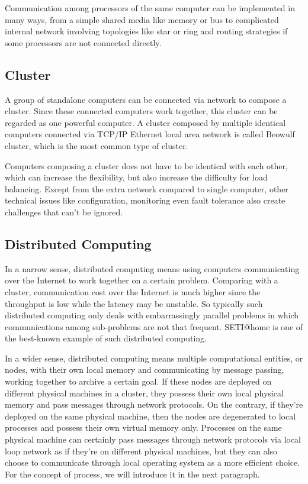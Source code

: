\documentclass[12pt,a4]{report}
\begin{document}
Communication among processors of the same computer can be implemented in many ways, from a simple shared media like memory or bus to complicated internal network involving topologies like star or ring and routing strategies if some processors are not connected directly.

\subsection{Cluster}

A group of standalone computers can be connected via network to compose a cluster. Since these connected computers work together, this cluster can be regarded as one powerful computer. A cluster composed by multiple identical computers connected via TCP/IP Ethernet local area network is called Beowulf cluster, which is the most common type of cluster.

Computers composing a cluster does not have to be identical with each other, which can increase the flexibility, but also increase the difficulty for load balancing. Except from the extra network compared to single computer, other technical issues like configuration, monitoring even fault tolerance also create challenges that can't be ignored.

\subsection{Distributed Computing}

In a narrow sense, distributed computing means using computers communicating over the Internet to work together on a certain problem. Comparing with a cluster, communication cost over the Internet is much higher since the throughput is low while the latency may be unstable. So typically such distributed computing only deals with embarrassingly parallel problems in which communications among sub-problems are not that frequent. SETI@home is one of the best-known example of such distributed computing.

In a wider sense, distributed computing means multiple computational entities, or nodes, with their own local memory and communicating by message passing, working together to archive a certain goal. If these nodes are deployed on different physical machines in a cluster, they possess their own local physical memory and pass messages through network protocols. On the contrary, if they're deployed on the same physical machine, then the nodes are degenerated to local processes and possess their own virtual memory only. Processes on the same physical machine can certainly pass messages through network protocols via local loop network as if they're on different physical machines, but they can also choose to communicate through local operating system as a more efficient choice. For the concept of process, we will introduce it in the next paragraph.
\end{document}
